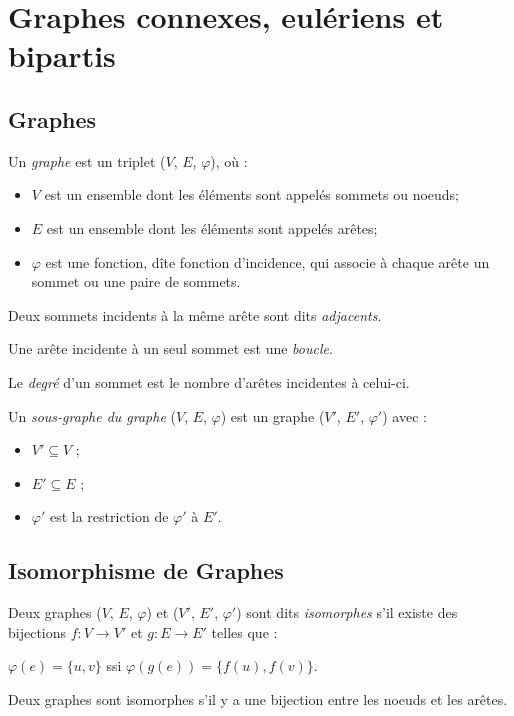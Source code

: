 \section{Graphes connexes, eulériens et bipartis }
\subsection{Graphes}

\begin{mydef}
  Un \emph{graphe} est un triplet ($V$, $E$, $\varphi$), où :
  \begin{itemize}
    \item $V$ est un ensemble dont les éléments sont appelés sommets ou noeuds;
    \item $E$ est un ensemble dont les éléments sont appelés arêtes;
    \item $\varphi$ est une fonction, dîte fonction d'incidence, qui associe à chaque arête un sommet ou une paire de sommets.
  \end{itemize}
\end{mydef}

\begin{mydef}
  Deux sommets incidents à la même arête sont dits \emph{adjacents}.
\end{mydef}

\begin{mydef}
  Une arête incidente à un seul sommet est une \emph{boucle}.
\end{mydef}

\begin{mydef}
  Le \emph{degré} d'un sommet est le nombre d'arêtes incidentes à celui-ci.
\end{mydef}

\begin{mydef}
  Un \emph{sous-graphe du graphe} ($V$, $E$, $\varphi$) est un graphe ($V'$, $E'$, $\varphi'$) avec :
  \begin{itemize}
    \item $V' \subseteq V$ ;
    \item $E' \subseteq E$ ;
    \item $\varphi'$ est la restriction de $\varphi'$ à $E'$.
  \end{itemize}
\end{mydef}

\subsection{Isomorphisme de Graphes}
\begin{mydef}
  Deux graphes ($V$, $E$, $\varphi$) et ($V'$, $E'$, $\varphi'$) sont dits \emph{isomorphes} s'il existe des bijections $f:V \to V'$ et $g:E \to E'$ telles que :
  \begin{center}
    $\varphi(e) = \{u, v\}$ ssi $\varphi(g(e)) = \{f(u), f(v)\}$.
  \end{center}
  Deux graphes sont isomorphes s'il y a une bijection entre les noeuds et les arêtes.
\end{mydef}

